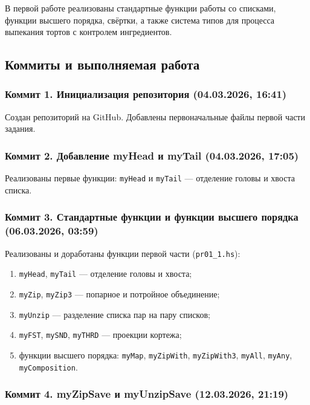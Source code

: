 \documentclass[a4paper, final]{article}
\begin{document}
В первой работе реализованы стандартные функции работы со списками, функции
высшего порядка, свёртки, а также система типов для процесса выпекания тортов
с контролем ингредиентов.

\subsection{Коммиты и выполняемая работа}

\subsubsection{Коммит 1. Инициализация репозитория (04.03.2026, 16:41)}

Создан репозиторий на GitHub. Добавлены первоначальные файлы первой части
задания.

\subsubsection{Коммит 2. Добавление myHead и myTail (04.03.2026, 17:05)}

Реализованы первые функции: \texttt{myHead} и \texttt{myTail} — отделение
головы и хвоста списка.

\subsubsection{Коммит 3. Стандартные функции и функции высшего порядка
               (06.03.2026, 03:59)}

Реализованы и доработаны функции первой части (\texttt{pr01\_1.hs}):
\begin{enumerate}[label=\alph*),leftmargin=*]
  \item \texttt{myHead}, \texttt{myTail} — отделение головы и хвоста;
  \item \texttt{myZip}, \texttt{myZip3} — попарное и потройное объединение;
  \item \texttt{myUnzip} — разделение списка пар на пару списков;
  \item \texttt{myFST}, \texttt{mySND}, \texttt{myTHRD} — проекции кортежа;
  \item функции высшего порядка: \texttt{myMap}, \texttt{myZipWith},
        \texttt{myZipWith3}, \texttt{myAll}, \texttt{myAny},
        \texttt{myComposition}.
\end{enumerate}

\subsubsection{Коммит 4. myZipSave и myUnzipSave (12.03.2026, 21:19)}
\end{document}
